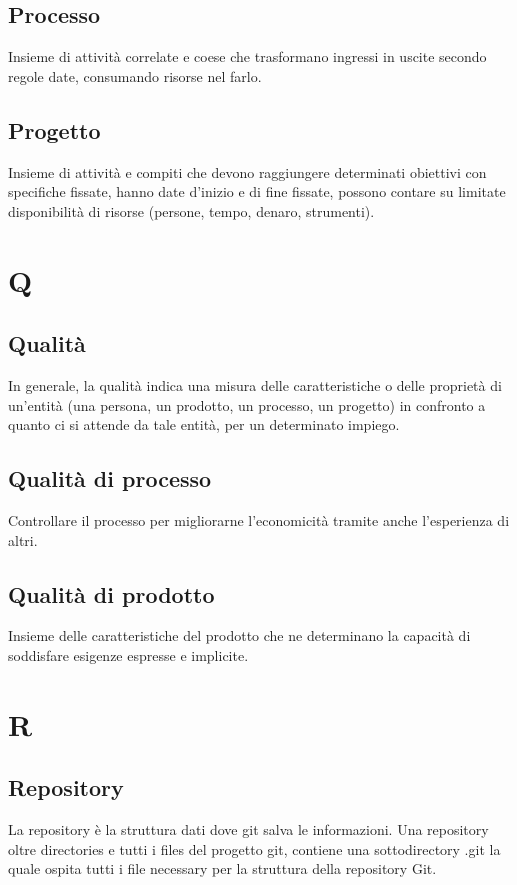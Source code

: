 	\subsection{Processo} 
	Insieme di attività correlate e coese che trasformano ingressi in uscite secondo regole date, consumando risorse nel farlo.

	\subsection{Progetto} 
	Insieme di attività e compiti che devono raggiungere determinati obiettivi con specifiche fissate, hanno date d'inizio e di fine fissate, possono contare su limitate disponibilità di risorse (persone, tempo, denaro, strumenti).
	
	\section{Q}
	\subsection{Qualità} 
	In generale, la qualità indica una misura delle caratteristiche o delle proprietà di un'entità (una persona, un prodotto, un processo, un progetto) in confronto a quanto ci si attende da tale entità, per un determinato impiego.
	
	\subsection{Qualità di processo}
	Controllare il processo per migliorarne l'economicità tramite anche l'esperienza di altri.
	
	\subsection{Qualità di prodotto}
	Insieme delle caratteristiche del prodotto che ne determinano la capacità di soddisfare esigenze espresse e implicite.
	
	
	\section{R}
	\subsection{Repository} 
	La repository è la struttura dati dove git salva le informazioni. Una repository oltre directories e tutti i files del progetto git, contiene una sottodirectory .git la quale ospita tutti i file necessary per la struttura della repository Git.

